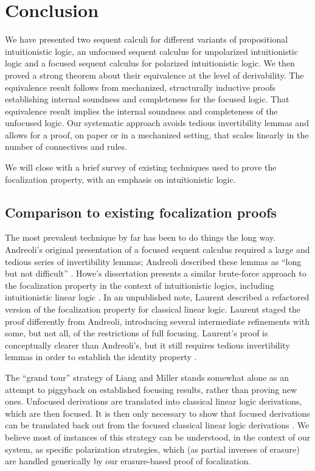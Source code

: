 \documentclass[acmtocl]{robtrans}\pdfoutput=1
\begin{document}
\section{Conclusion}
\label{sec:previous}

We have presented two sequent calculi for different variants of
propositional intuitionistic logic, an unfocused sequent calculus for
unpolarized intuitionistic logic and a focused sequent calculus for
polarized intuitionistic logic.  We then proved a strong theorem about
their equivalence at the level of derivability. The equivalence result
follows from mechanized, structurally inductive proofs establishing
internal soundness and completeness for the focused logic. That
equivalence result implies the internal soundness and completeness of
the unfocused logic. Our systematic approach avoids
tedious invertibility lemmas and allows for a proof, on paper or 
in a mechanized setting, that scales linearly in the number of
connectives and rules.

We will close with a brief survey of existing techniques used to prove
the focalization property, with an emphasis on intuitionistic logic.

\subsection{Comparison to existing focalization proofs}

The most prevalent technique by far has been to do things the long
way.  Andreoli's original presentation of a focused sequent calculus
required a large and tedious series of invertibility lemmas; Andreoli
described these lemmas as ``long but not difficult''
\cite{andreoli92logic}.  Howe's dissertation presents a similar
brute-force approach to the focalization property in the context of
intuitionistic logics, including intuitionistic linear logic
\cite{howe98proof}.  In an unpublished note, Laurent described a
refactored version of the focalization property for classical linear
logic. Laurent staged the proof differently from Andreoli, introducing
several intermediate refinements with some, but not all, of the
restrictions of full focusing.  Laurent's proof is conceptually
clearer than Andreoli's, but it still requires tedious invertibility
lemmas in order to establish the identity property
\cite{laurent04proof}.

The ``grand tour'' strategy of Liang and Miller stands somewhat alone
as an attempt to piggyback on established focusing results, rather
than proving new ones.  Unfocused derivations are translated into
classical linear logic derivations, which are then focused. It is then
only necessary to show that focused derivations can be translated back
out from the focused classical linear logic derivations
\cite{liang09focusing}.  We believe most of instances of this strategy
can be understood, in the context of our system, as specific
polarization strategies, which (as partial inverses of erasure) are
handled generically by our erasure-based proof of focalization.
 
\end{document}
